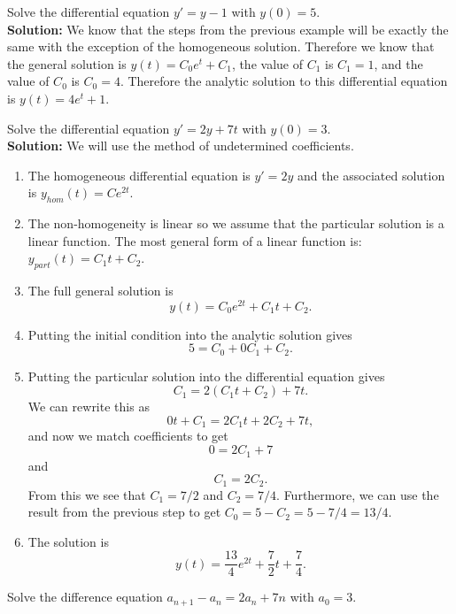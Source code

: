 \begin{example}
    Solve the differential equation $y' = y - 1$ with $y(0) = 5$.  \\{\bf Solution:} We
    know that the steps from the previous example will be exactly the same with the
    exception of the homogeneous solution.  Therefore we know that the general solution is
    $y(t) = C_0 e^{t} + C_1$, the value of $C_1$ is $C_1 = 1$, and the value of $C_0$ is
    $C_0 = 4$.  Therefore the analytic solution to this differential equation is $y(t) = 4 e^t + 1$.
\end{example}

\begin{example}
    Solve the differential equation $y' = 2y + 7t$ with $y(0) = 3$. \\{\bf Solution:} We
    will use the method of undetermined coefficients.  
    \begin{enumerate}
        \item The homogeneous differential equation is $y' = 2y$ and the associated
            solution is $y_{hom}(t) = Ce^{2t}$.  
        \item The non-homogeneity is linear so we assume that the particular solution is a
            linear function.  The most general form of a linear function is: $y_{part}(t)
            = C_1 t + C_2$.
        \item The full general solution is
            \[ y(t) = C_0 e^{2t} + C_1 t + C_2. \]
        \item Putting the initial condition into the analytic solution gives 
            \[ 5 = C_0 + 0 C_1 + C_2. \]
        \item Putting the particular solution into the differential equation gives
            \[ C_1 = 2(C_1t + C_2) + 7t. \]
            We can rewrite this as 
            \[ 0t + C_1 = 2C_1 t + 2C_2 + 7t, \]
            and now we match coefficients to get
            \[ 0 = 2C_1 + 7 \]
            and 
            \[ C_1 = 2C_2. \]
            From this we see that $C_1 = 7/2$ and $C_2 = 7/4.$  Furthermore, we can use
            the result from the previous step to get $C_0 = 5 - C_2 = 5 - 7/4 = 13/4.$
        \item The solution is
            \[ y(t) = \frac{13}{4} e^{2t} + \frac{7}{2} t + \frac{7}{4}. \]
    \end{enumerate}
\end{example}

\begin{problem}
    Solve the difference equation $a_{n+1} - a_n = 2a_n + 7n$ with $a_0 = 3$.
\end{problem}


